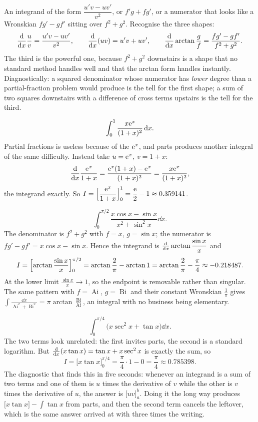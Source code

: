 \cue An integrand of the form $\dfrac{u'v-uv'}{v^{2}}$, or $f'g+fg'$, or a numerator that looks like a Wronskian $fg'-gf'$ sitting over $f^{2}+g^{2}$.
\method Recognise the three shapes:
\[\frac{\mathrm{d}}{\mathrm{d}x}\frac{u}{v}=\frac{u'v-uv'}{v^{2}},\qquad \frac{\mathrm{d}}{\mathrm{d}x}(uv)=u'v+uv',\qquad \frac{\mathrm{d}}{\mathrm{d}x}\arctan\frac{g}{f}=\frac{fg'-gf'}{f^{2}+g^{2}}.\]
The third is the powerful one, because $f^{2}+g^{2}$ downstairs is a shape that no standard method handles well and that the arctan form handles instantly. Diagnostically: a squared denominator whose numerator has \emph{lower} degree than a partial-fraction problem would produce is the tell for the first shape; a sum of two squares downstairs with a difference of cross terms upstairs is the tell for the third.

\begin{worked}
\[\int_0^{1}\frac{x\mathrm{e}^{x}}{(1+x)^{2}}\,\mathrm{d} x.\]
Partial fractions is useless because of the $\mathrm{e}^{x}$, and parts produces another integral of the same difficulty. Instead take $u=\mathrm{e}^{x}$, $v=1+x$:
\[\frac{\mathrm{d}}{\mathrm{d}x}\frac{\mathrm{e}^{x}}{1+x}=\frac{\mathrm{e}^{x}(1+x)-\mathrm{e}^{x}}{(1+x)^{2}}=\frac{x\mathrm{e}^{x}}{(1+x)^{2}},\]
the integrand exactly. So $I=\Bigl[\dfrac{\mathrm{e}^{x}}{1+x}\Bigr]_0^{1}=\dfrac{\mathrm{e}}{2}-1\approx0.359141$.
\end{worked}

\begin{worked}
\[\int_0^{\pi/2}\frac{x\cos x-\sin x}{x^{2}+\sin^{2}x}\dd x.\]
The denominator is $f^{2}+g^{2}$ with $f=x$, $g=\sin x$; the numerator is $fg'-gf'=x\cos x-\sin x$. Hence the integrand is $\frac{\mathrm{d}}{\mathrm{d}x}\arctan\dfrac{\sin x}{x}$ and
\[I=\Bigl[\arctan\frac{\sin x}{x}\Bigr]_0^{\pi/2}=\arctan\frac{2}{\pi}-\arctan1=\arctan\frac{2}{\pi}-\frac{\pi}{4}\approx-0.218487.\]
At the lower limit $\tfrac{\sin x}{x}\to1$, so the endpoint is removable rather than singular. The same pattern with $f=\operatorname{Ai}$, $g=\operatorname{Bi}$ and their constant Wronskian $\tfrac1\pi$ gives $\displaystyle\int\frac{\dd x}{\operatorname{Ai}^{2}+\operatorname{Bi}^{2}}=\pi\arctan\frac{\operatorname{Bi}}{\operatorname{Ai}}$, an integral with no business being elementary.
\end{worked}

\begin{worked}
\[\int_0^{\pi/4}\bigl(x\sec^{2}x+\tan x\bigr)\dd x.\]
The two terms look unrelated: the first invites parts, the second is a standard logarithm. But $\frac{\mathrm{d}}{\mathrm{d}x}(x\tan x)=\tan x+x\sec^{2}x$ is exactly the sum, so
\[I=\bigl[x\tan x\bigr]_0^{\pi/4}=\frac{\pi}{4}\cdot1-0=\frac{\pi}{4}\approx0.785398.\]
The diagnostic that finds this in five seconds: whenever an integrand is a sum of two terms and one of them is $u$ times the derivative of $v$ while the other is $v$ times the derivative of $u$, the answer is $\bigl[uv\bigr]_a^{b}$. Doing it the long way produces $\bigl[x\tan x\bigr]-\int\tan x$ from parts, and then the second term cancels the leftover, which is the same answer arrived at with three times the writing.
\end{worked}

